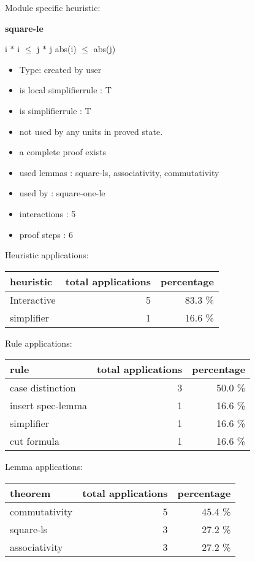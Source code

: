 \documentclass[a4paper]{article}
\begin{document}
Module specific heuristic:

\pagebreak

{\LARGE\bf square-le}\label{lemma-square-le}

\medskip

 \Fol i $*$ i $\le$ j $*$ j \Equiv abs(i) $\le$ abs(j)

\begin{itemize}

\item Type: created by user

\item is local simplifierrule : T
\item is simplifierrule : T
\item not used by any units in proved state.
\item       a complete proof exists
\item       used lemmas  : square-ls, associativity, commutativity
\item       used by      : square-one-le
\item       interactions : 5
\item       proof steps  : 6
\end{itemize}

\medskip


Heuristic applications:

\begin{supertabular}{l|r|r}
heuristic	& total applications & percentage \\ \hline
Interactive & 5 & 83.3 \% \\
simplifier & 1 & 16.6 \% \\

\end{supertabular}

Rule applications:

\begin{supertabular}{l|r|r}
rule	        & total applications & percentage \\ \hline
case distinction & 3 & 50.0 \% \\
insert spec-lemma & 1 & 16.6 \% \\
simplifier & 1 & 16.6 \% \\
cut formula & 1 & 16.6 \% \\

\end{supertabular}

Lemma applications:

\begin{supertabular}{l|r|r}
theorem	        & total applications & percentage \\ \hline
commutativity & 5 & 45.4 \% \\
square-ls & 3 & 27.2 \% \\
associativity & 3 & 27.2 \% \\

\end{supertabular}
\end{document}
